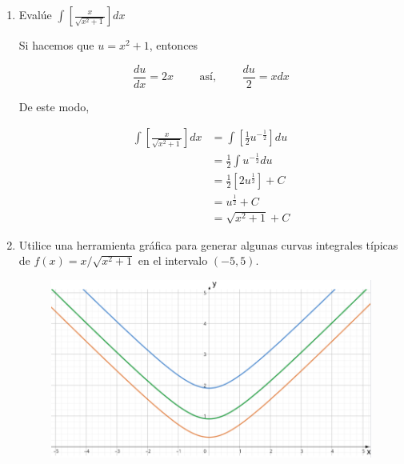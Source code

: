 \documentclass[12pt]{article}
\begin{document}
\begin{enumerate}[label=(\alph*)]
  
\item Evalúe $\int \left[ \frac {x}{\sqrt{x^2+1}}  \right] dx$

  Si hacemos que $u = x^2+1$, entonces
  
  \[
  \frac{du}{dx}=2x \qquad \text{ así, } \qquad \frac{du}{2}=xdx
  \]

  De este modo,

  \begin{align*}
    \int \left[ \frac {x}{\sqrt{x^2+1}}  \right] dx
    &= \int \left[ \frac {1}{2} u^{-\frac{1}{2}}  \right] du \\
    &= \frac {1}{2} \int u^{-\frac{1}{2}} du \\
    &=  \frac {1}{2} \left[ 2u^{\frac{1}{2}} \right] + C \\
    &= u^{\frac{1}{2}} +C \\
    &= \sqrt{x^2+1} +C
  \end{align*}

\item Utilice una herramienta gráfica para generar algunas curvas integrales típicas de $f(x) = x / \sqrt{x^2 + 1}$ en el intervalo $(-5, 5)$.

  \begin{figure}[H]
       \centering
       \includegraphics[width=1\textwidth]{../img/img_Lista4/1_73_b.png}
  \end{figure}
  
\end{enumerate}

\end{document}
